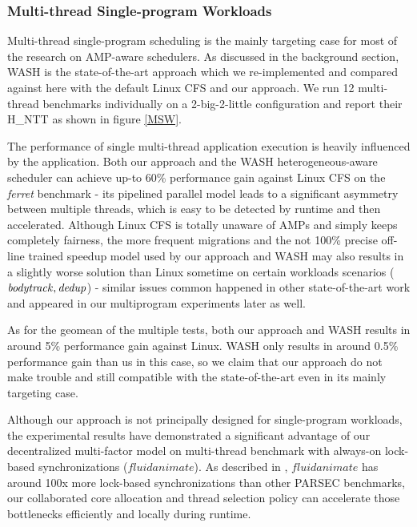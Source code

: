 \documentclass[sigplan,review,anonymous]{acmart}\settopmatter{printfolios=true,printccs=false,printacmref=false}
\begin{document}
\subsubsection{Multi-thread Single-program Workloads}
Multi-thread single-program scheduling is the mainly targeting case for most of the research on AMP-aware schedulers. As discussed in the background section, WASH is the state-of-the-art approach which we re-implemented and compared against here with the default Linux CFS and our approach. We run 12 multi-thread benchmarks individually on a 2-big-2-little configuration and report their H\_NTT as shown in figure \ref{MSW}.

The performance of single multi-thread application execution is heavily influenced by the application. Both our approach and the WASH heterogeneous-aware scheduler can achieve up-to 60\% performance gain against Linux CFS on the {\it ferret} benchmark - its pipelined parallel model leads to a significant asymmetry between multiple threads, which is easy to be detected by runtime and then accelerated. 
Although Linux CFS is totally unaware of AMPs and simply keeps completely fairness, the more frequent migrations and the not 100\% precise off-line trained speedup model used by our approach and WASH may also results in a slightly worse solution than Linux sometime on certain workloads scenarios ($\it bodytrack, dedup$) - similar issues common happened in other state-of-the-art work \cite{jibaja2016portable} and appeared in our multiprogram experiments later as well.

As for the geomean of the multiple tests, both our approach and WASH results in around 5\% performance gain against Linux. WASH only results in around 0.5\% performance gain than us in this case, so we claim that our approach do not make trouble and still compatible with the state-of-the-art even in its mainly targeting case. 

Although our approach is not principally designed for single-program workloads, the experimental results have demonstrated a significant advantage of our decentralized multi-factor model on multi-thread benchmark with always-on lock-based synchronizations  ($fluidanimate$). As described in \cite{bienia08characterization}, $fluidanimate$ has around 100x more lock-based synchronizations than other PARSEC benchmarks, our collaborated core allocation and thread selection policy can accelerate those bottlenecks efficiently and locally during runtime.  
\end{document}
